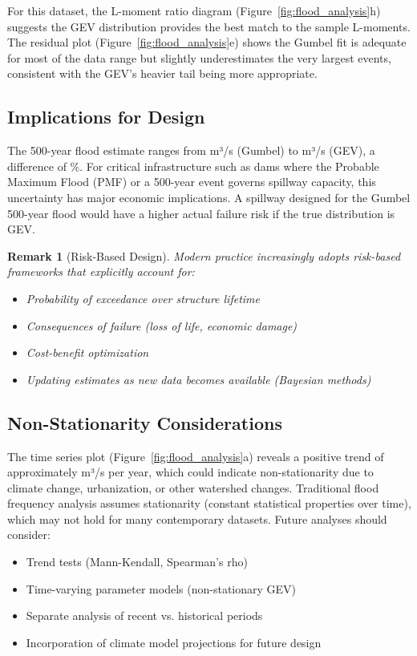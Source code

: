 \documentclass[a4paper, 11pt]{article}
\newtheorem{remark}{Remark}[section]
\begin{document}
For this dataset, the L-moment ratio diagram (Figure~\ref{fig:flood_analysis}h) suggests the
GEV distribution provides the best match to the sample L-moments. The residual plot
(Figure~\ref{fig:flood_analysis}e) shows the Gumbel fit is adequate for most of the data range
but slightly underestimates the very largest events, consistent with the GEV's heavier tail
being more appropriate.

\subsection{Implications for Design}

The 500-year flood estimate ranges from  m³/s (Gumbel) to
 m³/s (GEV), a difference of \%.
For critical infrastructure such as dams where the Probable Maximum Flood (PMF) or a
500-year event governs spillway capacity, this uncertainty has major economic implications.
A spillway designed for the Gumbel 500-year flood would have a higher actual failure risk
if the true distribution is GEV.

\begin{remark}[Risk-Based Design]
Modern practice increasingly adopts risk-based frameworks that explicitly account for:
\begin{itemize}
\item Probability of exceedance over structure lifetime
\item Consequences of failure (loss of life, economic damage)
\item Cost-benefit optimization
\item Updating estimates as new data becomes available (Bayesian methods)
\end{itemize}
\end{remark}

\subsection{Non-Stationarity Considerations}

The time series plot (Figure~\ref{fig:flood_analysis}a) reveals a positive trend of
approximately  m³/s per year, which could indicate non-stationarity
due to climate change, urbanization, or other watershed changes. Traditional flood frequency
analysis assumes stationarity (constant statistical properties over time), which may not hold
for many contemporary datasets. Future analyses should consider:
\begin{itemize}
\item Trend tests (Mann-Kendall, Spearman's rho)
\item Time-varying parameter models (non-stationary GEV)
\item Separate analysis of recent vs. historical periods
\item Incorporation of climate model projections for future design
\end{itemize}
\end{document}
